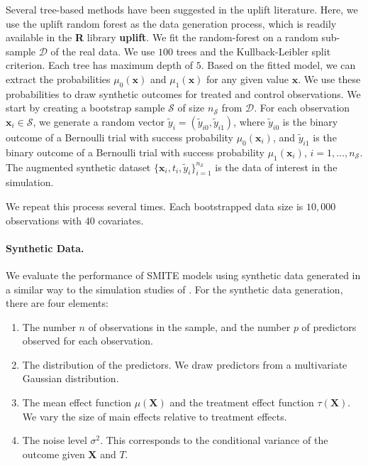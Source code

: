 \documentclass{article}
\def\X{\mathbf X}
\def\x{\mathbf x}
\begin{document}
Several tree-based methods have been suggested in the uplift literature. Here, we use the uplift random forest \citep{guelman2012random} as the data generation process, which is readily available in the {\bf R} library {\bf uplift}. We fit the random-forest on a random sub-sample $\mathcal{D}$ of the real data. We use $100$ trees and the Kullback-Leibler split criterion. Each tree has maximum depth of $5$. Based on the fitted model, we can extract the probabilities $\mu_0(\x)$ and $\mu_1(\x)$ for any given value $\mathbf{x}$. We use these probabilities to draw synthetic outcomes for treated and control observations. We start by creating a bootstrap sample $\mathcal{S}$ of size $n_\mathcal{S}$ from $\mathcal{D}$. For each observation $\mathbf{x}_i \in \mathcal{S}$, we generate a random vector $\tilde{y}_i =(\tilde{y}_{i0}, \tilde{y}_{i1})$, where $\tilde{y}_{i0}$ is the binary outcome of a Bernoulli trial with success probability $\mu_0(\mathbf{x}_i)$, and  $\tilde{y}_{i1}$ is the binary outcome of a Bernoulli trial with success probability  $\mu_1(\mathbf{x}_i)$, $i=1,\ldots, n_\mathcal{S}$. The augmented synthetic dataset $\{ \x_i , t_i, \tilde{y}_i \}_{i=1}^{n_{\mathcal{S}}}$ is the data of interest in the simulation.

We repeat this process several times. Each bootstrapped data size is $10,000$ observations with $40$ covariates. 

\paragraph{Synthetic Data.} We evaluate the performance of SMITE models using synthetic data generated in a similar way to the simulation studies of \cite{tian2014simple}. For the synthetic data generation, there are four elements:

\begin{enumerate}
    \item The number $n$ of observations in the sample, and the number $p$ of predictors observed for each observation.
    \item The distribution of the predictors. We draw predictors from a multivariate Gaussian distribution.
    \item The mean effect function $\mu(\X)$ and the treatment effect function $\tau(\X)$. We vary the size of main effects relative to treatment effects.
    \item The noise level $\sigma^2$. This corresponds to the conditional variance of the outcome given $\X$ and $T$. 
\end{enumerate}
\end{document}
